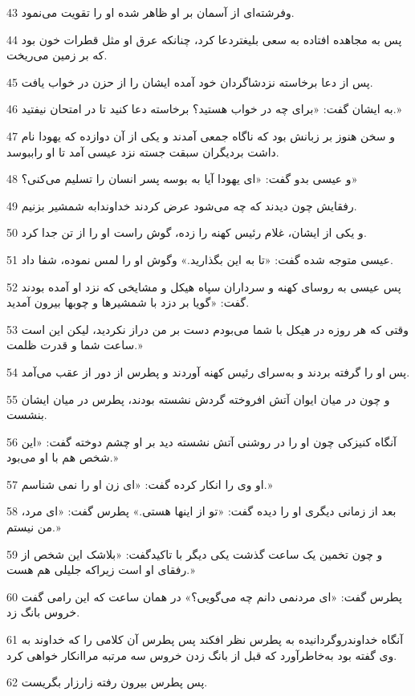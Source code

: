 \par 43 وفرشته‌ای از آسمان بر او ظاهر شده او را تقویت می‌نمود.
\par 44 پس به مجاهده افتاده به سعی بلیغتردعا کرد، چنانکه عرق او مثل قطرات خون بود که بر زمین می‌ریخت.
\par 45 پس از دعا برخاسته نزدشاگردان خود آمده ایشان را از حزن در خواب یافت.
\par 46 به ایشان گفت: «برای چه در خواب هستید؟ برخاسته دعا کنید تا در امتحان نیفتید.»
\par 47 و سخن هنوز بر زبانش بود که ناگاه جمعی آمدند و یکی از آن دوازده که یهودا نام داشت بردیگران سبقت جسته نزد عیسی آمد تا او راببوسد.
\par 48 و عیسی بدو گفت: «ای یهودا آیا به بوسه پسر انسان را تسلیم می‌کنی؟»
\par 49 رفقایش چون دیدند که چه می‌شود عرض کردند خداوندابه شمشیر بزنیم.
\par 50 و یکی از ایشان، غلام رئیس کهنه را زده، گوش راست او را از تن جدا کرد.
\par 51 عیسی متوجه شده گفت: «تا به این بگذارید.» وگوش او را لمس نموده، شفا داد.
\par 52 پس عیسی به روسای کهنه و سرداران سپاه هیکل و مشایخی که نزد او آمده بودند گفت: «گویا بر دزد با شمشیرها و چوبها بیرون آمدید.
\par 53 وقتی که هر روزه در هیکل با شما می‌بودم دست بر من دراز نکردید، لیکن این است ساعت شما و قدرت ظلمت.»
\par 54 پس او را گرفته بردند و به‌سرای رئیس کهنه آوردند و پطرس از دور از عقب می‌آمد.
\par 55 و چون در میان ایوان آتش افروخته گردش نشسته بودند، پطرس در میان ایشان بنشست.
\par 56 آنگاه کنیزکی چون او را در روشنی آتش نشسته دید بر او چشم دوخته گفت: «این شخص هم با او می‌بود.»
\par 57 او وی را انکار کرده گفت: «ای زن او را نمی شناسم.»
\par 58 بعد از زمانی دیگری او را دیده گفت: «تو از اینها هستی.» پطرس گفت: «ای مرد، من نیستم.»
\par 59 و چون تخمین یک ساعت گذشت یکی دیگر با تاکیدگفت: «بلاشک این شخص از رفقای او است زیراکه جلیلی هم هست.»
\par 60 پطرس گفت: «ای مردنمی دانم چه می‌گویی؟» در همان ساعت که این رامی گفت خروس بانگ زد.
\par 61 آنگاه خداوندروگردانیده به پطرس نظر افکند پس پطرس آن کلامی را که خداوند به وی گفته بود به‌خاطرآورد که قبل از بانگ زدن خروس سه مرتبه مراانکار خواهی کرد.
\par 62 پس پطرس بیرون رفته زارزار بگریست.
